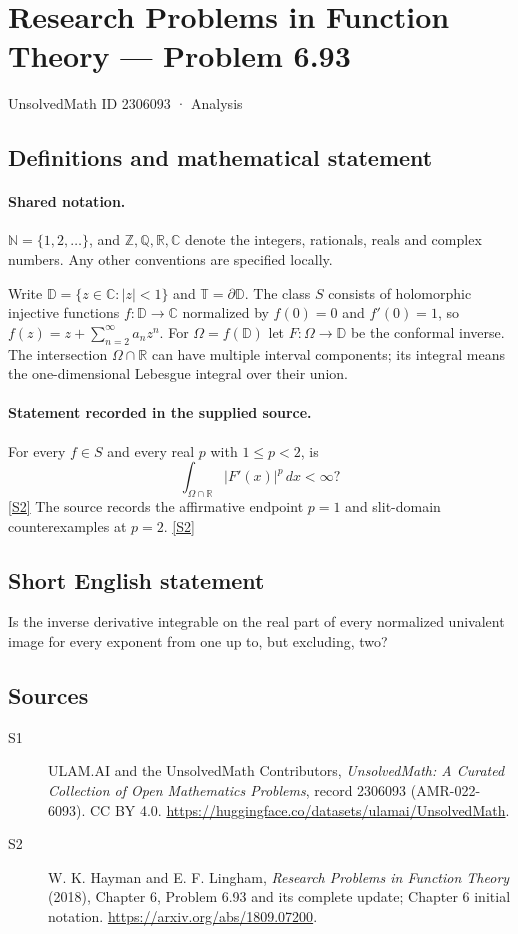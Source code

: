\documentclass[11pt]{article}
\newcommand{\sref}[2]{\hyperlink{source:#1:#2}{[S#2]}}
\begin{document}
\setcounter{section}{2306092}
\section{Research Problems in Function Theory — Problem 6.93}\label{2306093}
{\small\sffamily UnsolvedMath ID 2306093 · Analysis}
\subsection{Definitions and mathematical statement}

\paragraph{Shared notation.}$\mathbb N=\{1,2,\ldots\}$, and $\mathbb Z,\mathbb Q,\mathbb R,\mathbb C$ denote the integers, rationals, reals and complex numbers. Any other conventions are specified locally.


Write $\mathbb D=\{z\in\mathbb C:|z|<1\}$ and $\mathbb T=\partial\mathbb D$. The class $S$ consists of holomorphic injective functions $f:\mathbb D\to\mathbb C$ normalized by $f(0)=0$ and $f'(0)=1$, so $f(z)=z+\sum_{n=2}^{\infty}a_nz^n$. For $\Omega=f(\mathbb D)$ let $F:\Omega\to\mathbb D$ be the conformal inverse. The intersection $\Omega\cap\mathbb R$ can have multiple interval components; its integral means the one-dimensional Lebesgue integral over their union.
\paragraph{Statement recorded in the supplied source.}
For every $f\in S$ and every real $p$ with $1\le p<2$, is \[\int_{\Omega\cap\mathbb R}|F'(x)|^p\,dx<\infty?\] \sref{2306093}{2}
The source records the affirmative endpoint $p=1$ and slit-domain counterexamples at $p=2$. \sref{2306093}{2}
\subsection{Short English statement}
Is the inverse derivative integrable on the real part of every normalized univalent image for every exponent from one up to, but excluding, two?
\subsection{Sources}
\begin{description}
\item[\hypertarget{source:2306093:1}{S1}] ULAM.AI and the UnsolvedMath Contributors, \emph{UnsolvedMath: A Curated Collection of Open Mathematics Problems}, record 2306093 (AMR-022-6093). CC BY 4.0. \url{https://huggingface.co/datasets/ulamai/UnsolvedMath}.
\item[\hypertarget{source:2306093:2}{S2}] W. K. Hayman and E. F. Lingham, \emph{Research Problems in Function Theory} (2018), Chapter 6, Problem 6.93 and its complete update; Chapter 6 initial notation. \url{https://arxiv.org/abs/1809.07200}.
\end{description}
\label{end:2306093}
\end{document}
